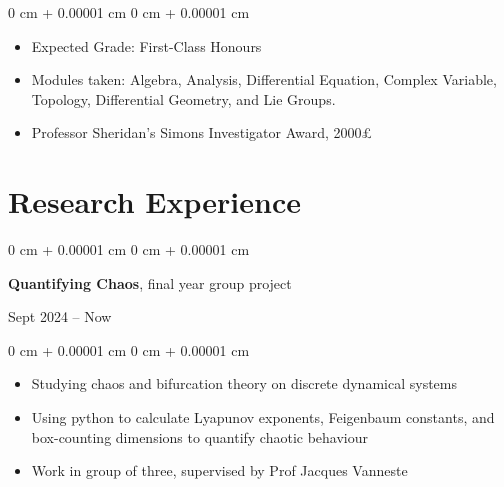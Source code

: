 \documentclass[10pt, a4paper]{article}
\newenvironment{highlights}{
    \begin{itemize}[
        topsep=0.10 cm,
        parsep=0.10 cm,
        partopsep=0pt,
        itemsep=0pt,
        leftmargin=0 cm + 10pt
    ]
}{
    \end{itemize}
} %
\newenvironment{onecolentry}{
    \begin{adjustwidth}{
        0 cm + 0.00001 cm
    }{
        0 cm + 0.00001 cm
    }
}{
    \end{adjustwidth}
} %
\newenvironment{twocolentry}[2][]{
    \onecolentry
    \def\secondColumn{#2}
    \setcolumnwidth{\fill, 4.5 cm}
    \begin{paracol}{2}
}{
    \switchcolumn \raggedleft \secondColumn
    \end{paracol}
    \endonecolentry
} %
\begin{document}
        \vspace{0.10 cm}
        \begin{onecolentry}
            \begin{highlights}
                \item Expected Grade: First-Class Honours
                \item Modules taken: Algebra, Analysis, Differential Equation, Complex Variable, Topology, Differential Geometry, and Lie Groups.
				\item Professor Sheridan's Simons Investigator Award, 2000£
            \end{highlights}
        \end{onecolentry}

    

	\section{Research Experience}

		\begin{twocolentry}{
	            Sept 2024 – Now
	        }
				\textbf{Quantifying Chaos}, final year group project
			\end{twocolentry}
	        \vspace{0.10 cm}
	        \begin{onecolentry}
	            \begin{highlights}
	                \item Studying chaos and bifurcation theory on discrete dynamical systems
					\item Using python to calculate Lyapunov exponents, Feigenbaum constants, and box-counting dimensions to quantify chaotic behaviour
					\item Work in group of three, supervised by Prof Jacques Vanneste 
	            \end{highlights}
	        \end{onecolentry}

		\vspace{0.2 cm}
\end{document}
